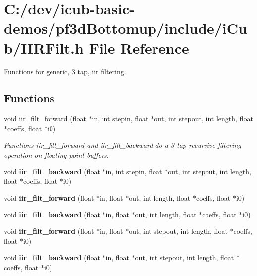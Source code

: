 \section{C\+:/dev/icub-\/basic-\/demos/pf3d\+Bottomup/include/i\+Cub/\+I\+I\+R\+Filt.h File Reference}
\label{IIRFilt_8h}


Functions for generic, 3 tap, iir filtering.  


\subsection*{Functions}
\begin{DoxyCompactItemize}
\item 
void \hyperlink{IIRFilt_8h_a43b5832facfac4984b38e11e2fa80b48}{iir\+\_\+filt\+\_\+forward} (float $\ast$in, int stepin, float $\ast$out, int stepout, int length, float $\ast$coeffs, float $\ast$i0)
\begin{DoxyCompactList}\small\item\em Functions iir\+\_\+filt\+\_\+forward and iir\+\_\+filt\+\_\+backward do a 3 tap recursive filtering operation on floating point buffers. \end{DoxyCompactList}\item 
void {\bfseries iir\+\_\+filt\+\_\+backward} (float $\ast$in, int stepin, float $\ast$out, int stepout, int length, float $\ast$coeffs, float $\ast$i0)\label{IIRFilt_8h_a43e9e9f0360bfee13e2651311a95390f}

\item 
void {\bfseries iir\+\_\+filt\+\_\+forward} (float $\ast$in, float $\ast$out, int length, float $\ast$coeffs, float $\ast$i0)\label{IIRFilt_8h_a10ff4d91b53ed479cc9eabd72b0399ca}

\item 
void {\bfseries iir\+\_\+filt\+\_\+backward} (float $\ast$in, float $\ast$out, int length, float $\ast$coeffs, float $\ast$i0)\label{IIRFilt_8h_aad0f69ef34717b6f4c4dc5bd4ec53fce}

\item 
void {\bfseries iir\+\_\+filt\+\_\+forward} (float $\ast$in, float $\ast$out, int stepout, int length, float $\ast$coeffs, float $\ast$i0)\label{IIRFilt_8h_a09014ca85db071904c4a15fbe2410633}

\item 
void {\bfseries iir\+\_\+filt\+\_\+backward} (float $\ast$in, float $\ast$out, int stepout, int length, float $\ast$coeffs, float $\ast$i0)\label{IIRFilt_8h_ada56d2d76b95a4274d14ae620b60a381}


\end{DoxyCompactItemize}
